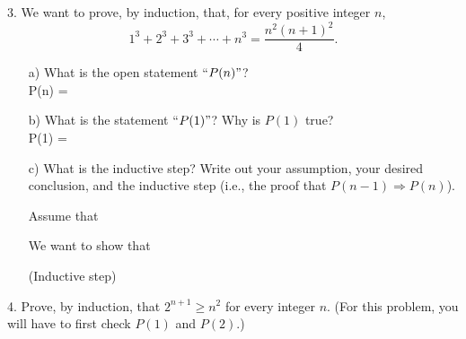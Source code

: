 \documentclass[12pt, reqno]{amsart}
\begin{document}
3. We want to prove, by induction, that, for every positive integer $n$, 
\[
1^3 + 2^3 + 3^3 + \cdots + n^3 = \frac{n^2(n+1)^2}{4}.
\]
\begin{itemize}
\item [a)] What is the open statement ``$P(n)"$?\\

P(n) = 
\vspace{1cm}
\item [b)] What is the statement ``$P(1)"$? Why is $P(1)$ true?\\

P(1) = 
\vspace{1cm}
\item [c)] What is the inductive step? Write out your assumption, your desired conclusion, and the inductive step (i.e., the proof that $P(n-1) \Rightarrow P(n)$).

 Assume that \\\vspace{0.5cm}

 We want to show that\\\vspace{0.5cm}

 (Inductive step)\\\vspace{0.5cm}

\end{itemize}

4. Prove, by induction, that $2^{n+1} \geq n^2$ for every integer $n$. (For this problem, you will have to first check $P(1)$ and $P(2)$.)
\end{document}
